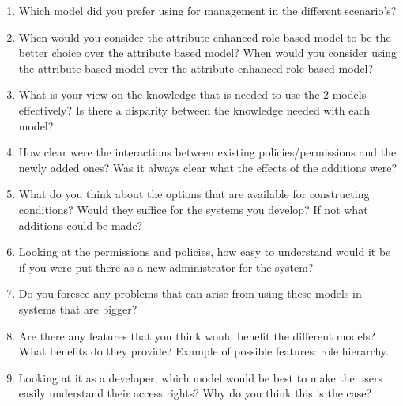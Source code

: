 \begin{enumerate}
    \item Which model did you prefer using for management in the different scenario's?
    
    \item When would you consider the attribute enhanced role based model to be the better choice over the attribute based model? When would you consider using the attribute based model over the attribute enhanced role based model?
    
    \item What is your view on the knowledge that is needed to use the 2 models effectively? Is there a disparity between the knowledge needed with each model?
    
    \item How clear were the interactions between existing policies/permissions and the newly added ones? Was it always clear what the effects of the additions were?
    
    \item What do you think about the options that are available for constructing conditions?  Would they suffice for the systems you develop? If not what additions could be made?
    
    \item Looking at the permissions and policies, how easy to understand would it be if you were put there as a new administrator for the system?
    
    \item Do you foresee any problems that can arise from using these models in systems that are bigger?
    
    \item Are there any features that you think would benefit the different models? What benefits do they provide? Example of possible features: role hierarchy.
    
    \item Looking at it as a developer, which model would be best to make the users easily understand their access rights? Why do you think this is the case?
    
\end{enumerate}

